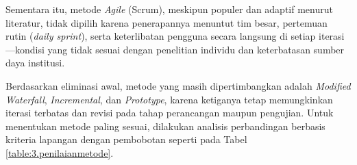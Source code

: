 Sementara itu, metode \textit{Agile} (Scrum), meskipun populer dan adaptif menurut literatur, tidak dipilih karena penerapannya menuntut tim besar, pertemuan rutin (\textit{daily sprint}), serta keterlibatan pengguna secara langsung di setiap iterasi---kondisi yang tidak sesuai dengan penelitian individu dan keterbatasan sumber daya institusi.\par

Berdasarkan eliminasi awal, metode yang masih dipertimbangkan adalah \textit{Modified Waterfall}, \textit{Incremental}, dan \textit{Prototype}, karena ketiganya tetap memungkinkan iterasi terbatas dan revisi pada tahap perancangan maupun pengujian. Untuk menentukan metode paling sesuai, dilakukan analisis perbandingan berbasis kriteria lapangan dengan pembobotan seperti pada Tabel \ref{table:3.penilaianmetode}.\par

